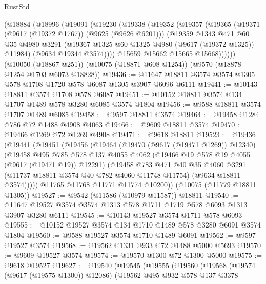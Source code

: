 \begin{lexlean}{RustStd}
\begin{coremodule}
{\begin{coremodule}
{{{{{{{{{{{{{{{{{{{{{{{{{{{{{{{{{    (@18884
      (@18996
        (@19091
          (@19230
            (@19338
              (@19352
                (@19357
                  (@19365
                    (@19371 (@9617 (@19372 @1767)) (@9625 (@9626 @6201)))
                    (@19359
                      @1343
                      @471
                      @60
                      @35
                      @4980
                      @3291
                      (@19367 @1325 @60 @1325 @4980 (@9617 (@19372 @1325)) @11984)
                      (@9634 @19344 @3574))))
                @15659
                @15662
                @15665
                @15668))))))
    (@10050 (@18867 @251))
    (@10075 (@18871 @608 @1254))
    (@9570 (@18878 @1254 @1703 @6073 @18828))
@19436 := @11647 @18811 @3574 @3574 @1305 @578 @1708 @1720 @578 @6087 @1305 @3907 @6096 @6111
@19441 := @10143 @18811 @3574 @1708 @578 @6087
@19451 := @10152 @18811 @3574 @134 @1707 @1489 @578 @3280 @6085 @3574 @1804
@19456 := @9588 @18811 @3574 @1707 @1489 @6085
@19458 := @9597 @18811 @3574
@19464 := @19458 @1284 @786 @72 @1488 @4908 @4063
@19466 := @9609 @18811 @3574
@19470 := @19466 @1269 @72 @1269 @4908
@19471 := @9618 @18811
@19523 := @19436
    (@19441
      (@19451
        (@19456
          (@19464
            (@19470 (@9617 (@19471 @1269)) @12340)
            (@19458
              @495
              @785
              @578
              @137
              @4055
              @4062
              (@19466 @19 @578 @19 @4055 (@9617 (@19471 @19)) @12291)
              (@19458
                @783
                @471
                @40
                @35
                @4060
                @3291
                (@11737 @18811 @3574 @40 @782 @4060 @11748 @11754)
                (@9634 @18811 @3574)))))
        @11765
        @11768
        @11771
        @11774
        @10200))
    (@10075 (@11779 @18811 @1305))
@19527 := @9542 (@11586 (@10979 @11587)) @18811
@19540 := @11647 @19527 @3574 @3574 @1313 @578 @1711 @1719 @578 @6093 @1313 @3907 @3280 @6111
@19545 := @10143 @19527 @3574 @1711 @578 @6093
@19555 := @10152 @19527 @3574 @134 @1710 @1489 @578 @3280 @6091 @3574 @1804
@19560 := @9588 @19527 @3574 @1710 @1489 @6091
@19562 := @9597 @19527 @3574
@19568 := @19562 @1331 @933 @72 @1488 @5000 @5693
@19570 := @9609 @19527 @3574
@19574 := @19570 @1300 @72 @1300 @5000
@19575 := @9618 @19527
@19627 := @19540
    (@19545
      (@19555
        (@19560
          (@19568
            (@19574 (@9617 (@19575 @1300)) @12086)
            (@19562
              @495
              @932
              @578
              @137
              @3378
}}}}}}}}}}}}}}}}}}}}}}}}}}}}}}}}}
\end{coremodule}}
\end{coremodule}
\end{lexlean}
